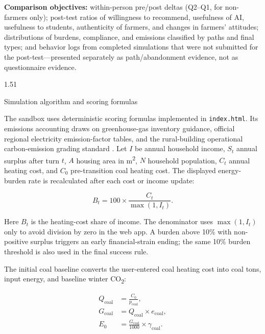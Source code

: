 \documentclass[stu,12pt,floatsintext,donotrepeattitle]{apa7}
\makeatletter
\newcommand{\Sihao}{\fontsize{14pt}{18pt}\selectfont}
\renewcommand{\subsection}{\@startsection{subsection}{2}{\z@}%
  {1.5\baselineskip}{1\baselineskip}%
  {\normalfont\Sihao\bfseries\raggedright}}
\makeatother
\begin{document}
\textbf{Comparison objectives:} within-person pre/post deltas (Q2--Q1, for non-farmers only); post-test ratios of willingness to recommend, usefulness of AI, usefulness to students, authenticity of farmers, and changes in farmers' attitudes; distributions of burdens, compliance, and emissions classified by paths and final types; and behavior logs from completed simulations that were not submitted for the post-test---presented separately as path/abandonment evidence, not as questionnaire evidence.

\subsection{Simulation algorithm and scoring formulas}

The sandbox uses deterministic scoring formulas implemented in \texttt{index.html}. Its emissions accounting draws on greenhouse-gas inventory guidance, official regional electricity emission-factor tables, and the rural-building operational carbon-emission grading standard \cite{mee2011ghg,mee2020grid,cabr2025rural}. Let \(I\) be annual household income, \(S_t\) annual surplus after turn \(t\), \(A\) housing area in m\textsuperscript{2}, \(N\) household population, \(C_t\) annual heating cost, and \(C_0\) pre-transition coal heating cost. The displayed energy-burden rate is recalculated after each cost or income update:

\begin{equation}
B_t = 100 \times \frac{C_t}{\max(1,I_t)} .
\end{equation}

Here \(B_t\) is the heating-cost share of income. The denominator uses \(\max(1,I_t)\) only to avoid division by zero in the web app. A burden above 10\% with non-positive surplus triggers an early financial-strain ending; the same 10\% burden threshold is also used in the final success rule.

The initial coal baseline converts the user-entered coal heating cost into coal tons, input energy, and baseline winter CO\textsubscript{2}:

\begin{align}
Q_{\mathrm{coal}} &= \frac{C_0}{p_{\mathrm{coal}}}, \\
G_{\mathrm{coal}} &= Q_{\mathrm{coal}} \times e_{\mathrm{coal}}, \\
E_0 &= \frac{G_{\mathrm{coal}}}{1000} \times \gamma_{\mathrm{coal}} .
\end{align}
\end{document}
